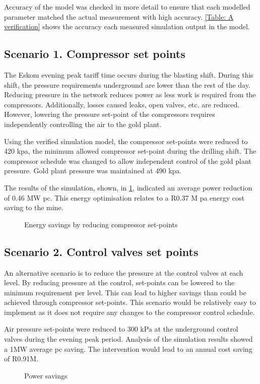 \par
Accuracy of the model was checked in more detail to ensure that each modelled parameter matched the actual measurement with high accuracy. \cref{Table: A verification} shows the accuracy each measured simulation output in the model.
\clearpage 
\subsection{Scenario 1. Compressor set points}
The Eskom evening peak tariff time occurs during the blasting shift. During this shift, the pressure requirements underground are lower than the rest of the day. Reducing pressure in the network reduces power as less work is required from the compressors. Additionally, losses caused leaks, open valves, etc. are reduced. However, lowering the pressure set-point of the compressors requires independently controlling the air to the gold plant. 
\par 
Using the verified simulation model, the compressor set-points were reduced to 420  \gls{kpa}, the minimum allowed compressor set-point during the drilling shift. The compressor schedule was changed to allow independent control of the gold plant pressure. Gold plant pressure was maintained at 490 \gls{kpa}. \par 
\par 
The results of the simulation, shown, in \cref{fig: CompSetpoints Results Beatrix}, indicated an average power reduction of 0.46 MW \gls{pc}. This energy optimisation relates to a R0.37 M \gls{pa} energy cost saving to the mine. 
\begin{figure}[h!]
	\centering
	
	\caption{Energy savings by reducing compressor set-points}
	\label{fig: CompSetpoints Results Beatrix}
\end{figure}

\subsection{Scenario 2. Control valves set points}
An alternative scenario is to reduce the pressure at the control valves at each level. By reducing pressure at the control, set-points can be lowered to the minimum requirement per level. This can lead to higher savings than could be achieved through compressor set-points. This scenario would be relatively easy to implement as it does not require any changes to the compressor control schedule.
\par 
Air pressure set-points were reduced to 300 kPa at  the underground control valves during the evening peak period. Analysis of the simulation results showed a  1MW average \gls{pc} saving. The intervention would lead to an annual cost saving of R0.91M.
\begin{figure}[h]
	\centering
	
	\caption{Power savings}
	\label{fig: Control Valve Results Beatrix}
\end{figure}

